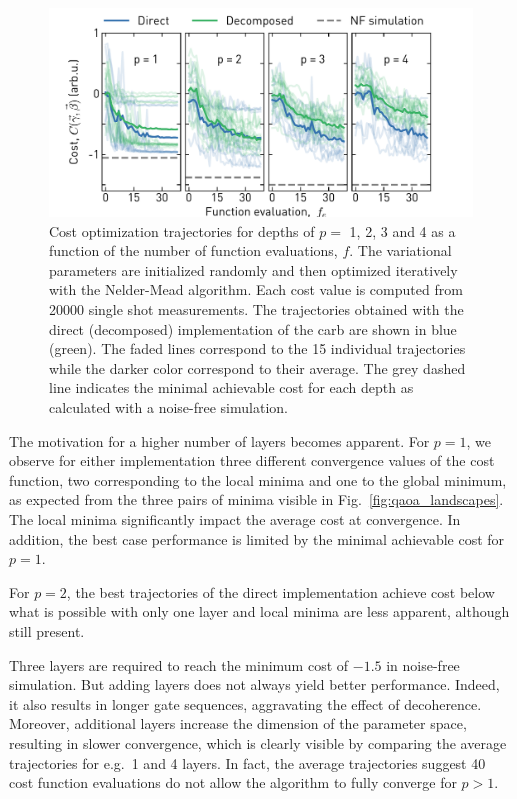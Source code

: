 \begin{figure}[ht]
    \centering
    \includegraphics[width=\textwidth]{chapters/qaoa/figs/ch5_qaoa_optimization_traces_one_line_20200205_212444.pdf}
    \caption{Cost optimization trajectories for depths of $p=$ 1, 2, 3 and 4 as a function of the number of function evaluations, $f$. The variational parameters are initialized randomly and then optimized iteratively with the Nelder-Mead algorithm. Each cost value is computed from 20000 single shot measurements. The trajectories obtained with the direct (decomposed) implementation of the \gls{carb} are shown in blue (green). The faded lines correspond to the 15 individual trajectories while the darker color correspond to their average. The grey dashed line indicates the minimal achievable cost for each depth as calculated with a noise-free simulation.}
    \label{fig:qaoa_optimization_traces}
\end{figure}

The motivation for a higher number of layers becomes apparent. For $p=1$, we observe for either implementation three different convergence values of the cost function, two corresponding to the local minima and one to the global minimum, as expected from the three pairs of minima visible in Fig.~\ref{fig:qaoa_landscapes}. The local minima significantly impact the average cost at convergence. In addition, the best case performance is limited by the minimal achievable cost for $p=1$.

For $p=2$, the best trajectories of the direct implementation achieve cost below what is possible with only one layer and local minima are less apparent, although still present. 

 Three layers are required to reach the minimum cost of $-1.5$ in noise-free simulation. But adding layers does not always yield better performance. Indeed, it also results in longer gate sequences, aggravating the effect of decoherence. Moreover, additional layers increase the dimension of the parameter space, resulting in slower convergence, which is clearly visible by comparing the average trajectories for e.g.\ 1 and 4 layers. In fact, the average trajectories suggest 40 cost function evaluations do not allow the algorithm to fully converge for $p > 1$. 

